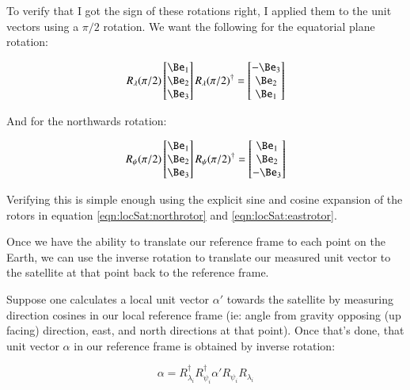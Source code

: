To verify that I got the sign of these rotations right, I applied them to the unit vectors using a $\pi/2$ rotation.  We want the following for the equatorial plane rotation:

\begin{equation*}
R_{\lambda}(\pi/2)
\begin{bmatrix}
\Be_1 \\
\Be_2 \\
\Be_3 \\
\end{bmatrix}
R_{\lambda}(\pi/2)^\dagger
=
\begin{bmatrix}
-\Be_3 \\
\Be_2 \\
\Be_1 \\
\end{bmatrix}
\end{equation*}

And for the northwards rotation:

\begin{equation*}
R_{\psi}(\pi/2)
\begin{bmatrix}
\Be_1 \\
\Be_2 \\
\Be_3 \\
\end{bmatrix}
R_{\psi}(\pi/2)^\dagger
=
\begin{bmatrix}
\Be_1 \\
\Be_2 \\
-\Be_3 \\
\end{bmatrix}
\end{equation*}

Verifying this is simple enough using the explicit sine and cosine expansion of the rotors in equation \ref{eqn:locSat:northrotor} and \ref{eqn:locSat:eastrotor}.

Once we have the ability to translate our reference frame to each point on the Earth, we can use the inverse rotation to translate our measured unit vector
to the satellite at that point back to the reference frame.

Suppose one calculates a local unit vector $\alpha'$ towards the satellite by measuring direction cosines in our local reference frame (ie: angle from gravity opposing (up facing) direction, east, and north directions at that point).
Once that's done, that unit vector $\alpha$ in our reference frame is obtained by inverse rotation:

\begin{equation}
\alpha = R_{\lambda_i}^\dagger R_{\psi_i}^\dagger \alpha' R_{\psi_i} R_{\lambda_i}
\end{equation}

